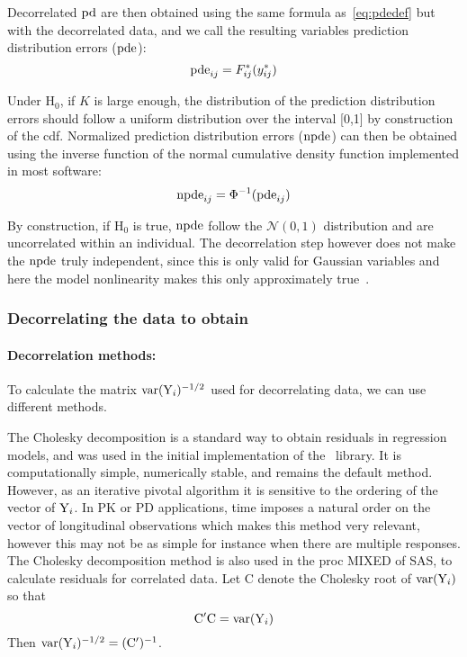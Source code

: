 Decorrelated ${\rm pd}$ are then obtained using the same formula as~\ref{eq:pdedef} but with the decorrelated data, and we call the resulting variables prediction distribution errors (${\rm pde}$):
\begin{equation}
{\rm pde}_{ij} = F^*_{ij}(y^*_{ij}) 
\end{equation}

Under H$_0$, if $K$ is large enough, the distribution of the prediction distribution errors should follow a uniform distribution over the interval [0,1] by construction of the cdf. Normalized prediction distribution errors (${\rm npde}$) can then be obtained using the inverse function of the normal cumulative density function implemented in most software:
\begin{equation}
{\rm npde}_{ij} = \Phi^{-1} ({\rm pde}_{ij})
\end{equation}

By construction, if H$_0$ is true, ${\rm npde}$ follow the $\mathcal{N}(0, 1)$ distribution and are uncorrelated within an individual. The decorrelation step however does not make the ${\rm npde}$ truly independent, since this is only valid for Gaussian variables and here the model nonlinearity makes this only approximately true~\cite{Comets10}.

\subsubsection{Decorrelating the data to obtain \pde} \label{subsec:decorrelation}

\paragraph{Decorrelation methods:} To calculate the matrix $\hbox{var}({\rm Y}_i)^{-1/2}$ used for decorrelating data, we can use different methods.

The Cholesky decomposition is a standard way to obtain residuals in regression models, and was used in the initial implementation of the \npde~library. It is computationally simple, numerically stable, and remains the default method. However, as an iterative pivotal algorithm it is sensitive to the ordering of the vector of ${\rm Y}_i$. In PK or PD applications, time imposes a natural order on the vector of longitudinal observations which makes this method very relevant, however this may not be as simple for instance when there are multiple responses. The Cholesky decomposition method is also used in the proc MIXED of SAS, to calculate residuals for correlated data. Let $\mathrm{C}$ denote the Cholesky root of $\hbox{var}({\rm Y}_i)$ so that $$\mathrm{C}'\mathrm{C} = \hbox{var}({\rm Y}_i)$$
Then $\hbox{var}({\rm Y}_i)^{-1/2} = (\mathrm{C}')^{-1}$. 

